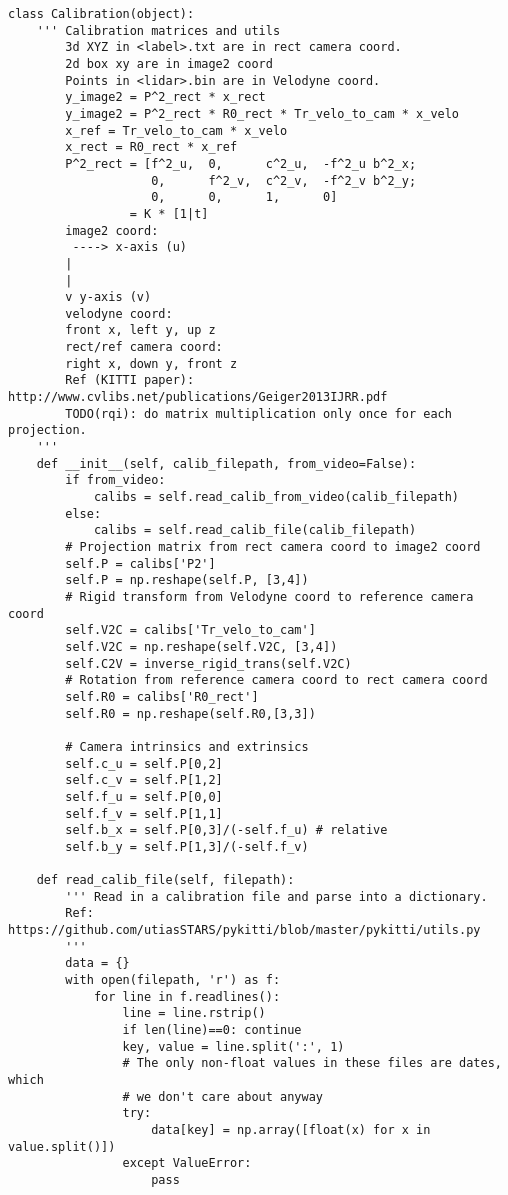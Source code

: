 \begin{lstlisting}
class Calibration(object):
    ''' Calibration matrices and utils
        3d XYZ in <label>.txt are in rect camera coord.
        2d box xy are in image2 coord
        Points in <lidar>.bin are in Velodyne coord.
        y_image2 = P^2_rect * x_rect
        y_image2 = P^2_rect * R0_rect * Tr_velo_to_cam * x_velo
        x_ref = Tr_velo_to_cam * x_velo
        x_rect = R0_rect * x_ref
        P^2_rect = [f^2_u,  0,      c^2_u,  -f^2_u b^2_x;
                    0,      f^2_v,  c^2_v,  -f^2_v b^2_y;
                    0,      0,      1,      0]
                 = K * [1|t]
        image2 coord:
         ----> x-axis (u)
        |
        |
        v y-axis (v)
        velodyne coord:
        front x, left y, up z
        rect/ref camera coord:
        right x, down y, front z
        Ref (KITTI paper): http://www.cvlibs.net/publications/Geiger2013IJRR.pdf
        TODO(rqi): do matrix multiplication only once for each projection.
    '''
    def __init__(self, calib_filepath, from_video=False):
        if from_video:
            calibs = self.read_calib_from_video(calib_filepath)
        else:
            calibs = self.read_calib_file(calib_filepath)
        # Projection matrix from rect camera coord to image2 coord
        self.P = calibs['P2'] 
        self.P = np.reshape(self.P, [3,4])
        # Rigid transform from Velodyne coord to reference camera coord
        self.V2C = calibs['Tr_velo_to_cam']
        self.V2C = np.reshape(self.V2C, [3,4])
        self.C2V = inverse_rigid_trans(self.V2C)
        # Rotation from reference camera coord to rect camera coord
        self.R0 = calibs['R0_rect']
        self.R0 = np.reshape(self.R0,[3,3])

        # Camera intrinsics and extrinsics
        self.c_u = self.P[0,2]
        self.c_v = self.P[1,2]
        self.f_u = self.P[0,0]
        self.f_v = self.P[1,1]
        self.b_x = self.P[0,3]/(-self.f_u) # relative 
        self.b_y = self.P[1,3]/(-self.f_v)

    def read_calib_file(self, filepath):
        ''' Read in a calibration file and parse into a dictionary.
        Ref: https://github.com/utiasSTARS/pykitti/blob/master/pykitti/utils.py
        '''
        data = {}
        with open(filepath, 'r') as f:
            for line in f.readlines():
                line = line.rstrip()
                if len(line)==0: continue
                key, value = line.split(':', 1)
                # The only non-float values in these files are dates, which
                # we don't care about anyway
                try:
                    data[key] = np.array([float(x) for x in value.split()])
                except ValueError:
                    pass


\end{lstlisting}
